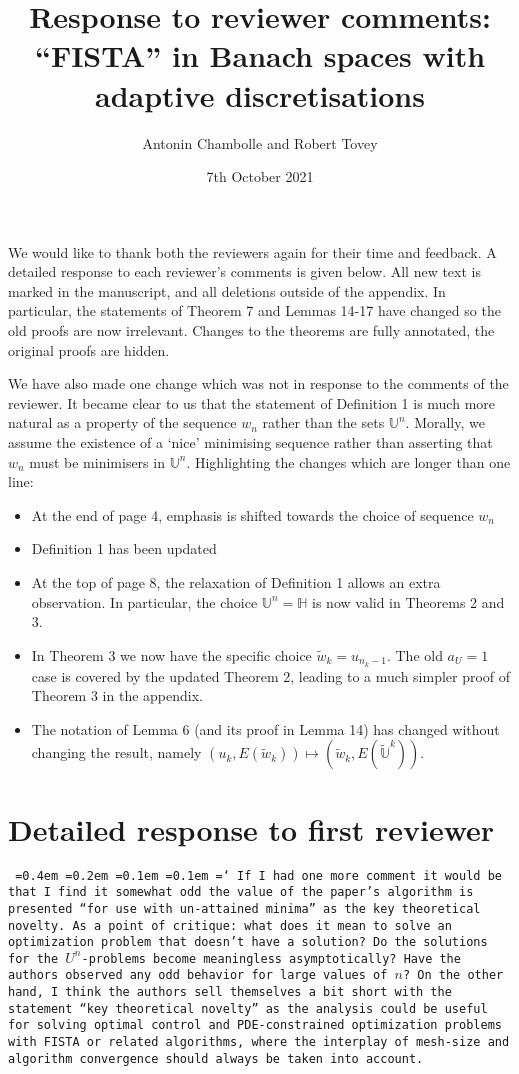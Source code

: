 \documentclass[12pt]{article}
\title{Response to reviewer comments:\\``FISTA'' in Banach spaces with adaptive discretisations}
\author{Antonin Chambolle and Robert Tovey}
\date{7th October 2021}
\newcommand*\justify{%
	\fontdimen2\font=0.4em%
	\fontdimen3\font=0.2em%
	\fontdimen4\font=0.1em%
	\fontdimen7\font=0.1em%
	\hyphenchar\font=`\-%
}
\newcommand{\review}[1]{\texttt{\justify{#1}}}
\newcommand{\F}[1]{\mathbb{#1}}
\begin{document}
\maketitle

We would like to thank both the reviewers again for their time and feedback. A detailed response to each reviewer's comments is given below. All new text is marked in the manuscript, and all deletions outside of the appendix. In particular, the statements of Theorem 7 and Lemmas 14-17 have changed so the old proofs are now irrelevant. Changes to the theorems are fully annotated, the original proofs are hidden.

We have also made one change which was not in response to the comments of the reviewer. It became clear to us that the statement of Definition 1 is much more natural as a property of the sequence $w_n$ rather than the sets $\F{U}^n$. Morally, we assume the existence of a `nice' minimising sequence rather than asserting that $w_n$ must be minimisers in $\F{U}^n$. Highlighting the changes which are longer than one line:
\begin{itemize}
	\item At the end of page 4, emphasis is shifted towards the choice of sequence $w_n$
	\item Definition 1 has been updated
	\item At the top of page 8, the relaxation of Definition 1 allows an extra observation. In particular, the choice $\F{U}^n=\F H$ is now valid in Theorems 2 and 3.
	\item In Theorem 3 we now have the specific choice $\tilde{w}_k = u_{n_k-1}$. The old $a_U=1$ case is covered by the updated Theorem 2, leading to a much simpler proof of Theorem 3 in the appendix.
	\item The notation of Lemma 6 (and its proof in Lemma 14) has changed without changing the result, namely $(u_k,E(\tilde{w}_k))\mapsto (\tilde{w}_k, E(\tilde{\F{U}}^k))$.
\end{itemize}


\section{Detailed response to first reviewer}
\review{If I had one more comment it would be that I find it somewhat odd the value of the paper's algorithm is presented ``for use with un-attained minima'' as the key theoretical novelty. As a point of critique: what does it mean to solve an optimization problem that doesn't have a solution? Do the solutions for the $U^n$-problems become meaningless asymptotically? Have the authors observed any odd behavior for large values of $n$? On the other hand, I think the authors sell themselves a bit short with the statement ``key theoretical novelty'' as the analysis could be useful for solving optimal control and PDE-constrained optimization problems with FISTA or related algorithms, where the interplay of mesh-size and algorithm convergence should always be taken into account.}
\end{document}
